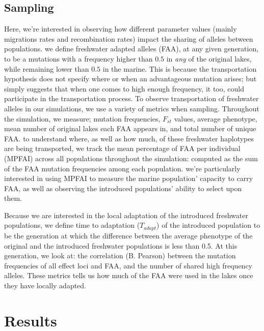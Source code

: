 \documentclass{article}
\begin{document}
\subsection{Sampling}


Here, we're interested in observing how different parameter values
(mainly migrations rates and recombination rates)
impact the sharing of alleles between populations. 
we define freshwater adapted alleles (FAA),
at any given generation,
to be a mutations with a frequency higher than $0.5$ in \textit{any} of the original lakes, 
while remaining lower than $0.5$ in the marine. 
This is because the transportation hypothesis does not specify where or when an advantageous mutation arises; 
but simply suggests that when one comes to high enough frequency, it too, could participate in the transportation process. \cite{Schluter2009}
To observe transportation of freshwater alleles in our simulations, we use a variety of metrics when sampling.
Throughout the simulation, we measure;
mutation frequencies, 
$F_{st}$ values, 
average phenotype, 
mean number of original lakes each FAA appears in,
and total number of unique FAA. 
to understand where, as well as how much, of these freshwater haplotypes are being transported,
we track the mean percentage of FAA per individual (MPFAI) across all populations throughout the simulation:
computed as the sum of the FAA mutation frequencies among each population.
we're particularly interested in using MPFAI to measure the marine population' capacity to carry FAA,
as well as observing the introduced populations' ability to select upon them. 

Because we are interested in the local adaptation of the introduced freshwater populations,
we define time to adaptation ($T_{adapt}$) of the introduced population to be the generation at which
the difference between the average phenotype of the original and the introduced freshwater populations is less than 0.5. 
At this generation, we look at:
the correlation (B. Pearson) between the mutation frequencies of all effect loci and FAA,
and the number of shared high frequency alleles. 
These metrics tells us how much of the FAA  were used in the lakes once they have locally adapted. 


\section{Results}
\end{document}
